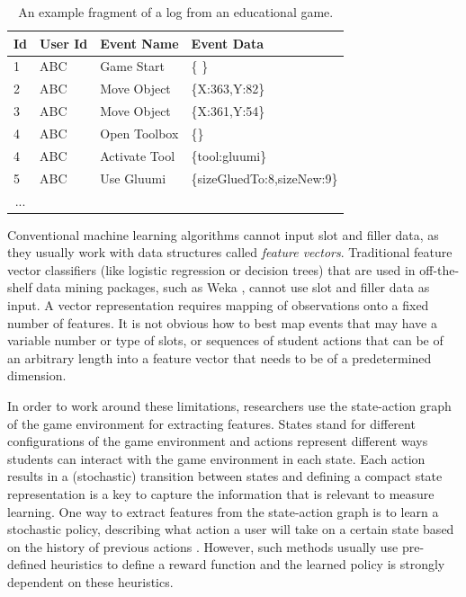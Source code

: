 \documentclass{sigchi}
\begin{document}
\begin{table}[tbh]
	\begin{tabular}{@{}llll@{}}
		\toprule
		\textbf{Id}             & \textbf{User Id} & \textbf{Event Name} & \textbf{Event Data}        \\ \midrule
		1                       & ABC              & Game Start          & \{ \}                        \\
		2                       & ABC              & Move Object         & \{X:363,Y:82\} \\
		3                       & ABC              & Move Object         & \{X:361,Y:54\} \\
		4                       & ABC              & Open Toolbox        & \{\}        \\
		4                       & ABC              & Activate Tool        & \{tool:gluumi\}        \\
		5                       & ABC              & Use Gluumi        & \{sizeGluedTo:8,sizeNew:9\} \\        
		\multicolumn{1}{c}{...} &                  &                     &                            \\ \bottomrule
	\end{tabular}
	\caption{An example fragment of a log from an educational game. \label{tbl:log_example}}
\end{table}


Conventional machine learning algorithms cannot input slot and filler data, as they  usually work with data structures called \textit{feature vectors}. 
Traditional feature vector classifiers (like logistic regression or decision trees)  that are used in off-the-shelf data mining packages, such as Weka \cite{hall2009weka}, cannot  use slot and filler data as input. 
A vector representation requires mapping of observations onto a fixed number of features.
It is not obvious how to best map events that may have a variable number or type of slots, or sequences of student actions that can be of an arbitrary length into a feature vector that needs to be of a predetermined dimension.

In order to work around these limitations, researchers use the state-action graph of the game environment for extracting features. 
States stand for different configurations of the game environment and actions represent different ways students can interact with the game environment in each state.
Each action results in a (stochastic) transition between states and defining a compact state representation is a key to capture the information that is relevant to measure learning.
One way to extract features from the state-action graph is to learn a stochastic policy, describing what action a user will take on a certain state based on the history of previous actions \cite{lee2014learning, liu2013predicting}.
However, such methods usually use pre-defined heuristics to define a reward function and the learned policy is strongly dependent on these
heuristics.
\end{document}
